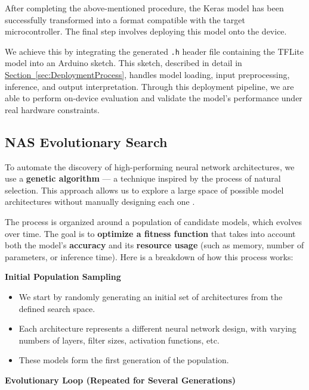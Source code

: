 After completing the above-mentioned procedure, the Keras model has been successfully transformed into a format compatible with the target microcontroller. The final step involves deploying this model onto the device.

We achieve this by integrating the generated \texttt{.h} header file containing the TFLite model into an Arduino sketch. This sketch, described in detail in \hyperref[sec:DeploymentProcess]{Section~\ref*{sec:DeploymentProcess}}, handles model loading, input preprocessing, inference, and output interpretation. Through this deployment pipeline, we are able to perform on-device evaluation and validate the model's performance under real hardware constraints.



\subsection{NAS Evolutionary Search}

To automate the discovery of high-performing neural network architectures, we use a \textbf{genetic algorithm} — a technique inspired by the process of natural selection. This approach allows us to explore a large space of possible model architectures without manually designing each one \cite{real2019regularized}.

The process is organized around a population of candidate models, which evolves over time. The goal is to \textbf{optimize a fitness function} that takes into account both the model’s \textbf{accuracy} and its \textbf{resource usage} (such as memory, number of parameters, or inference time).
Here is a breakdown of how this process works:

\textbf{Initial Population Sampling}
\begin{itemize}
    \item We start by randomly generating an initial set of architectures from the defined search space.
    \item Each architecture represents a different neural network design, with varying numbers of layers, filter sizes, activation functions, etc.
    \item These models form the first generation of the population.


\end{itemize}

\textbf{Evolutionary Loop (Repeated for Several Generations)}

